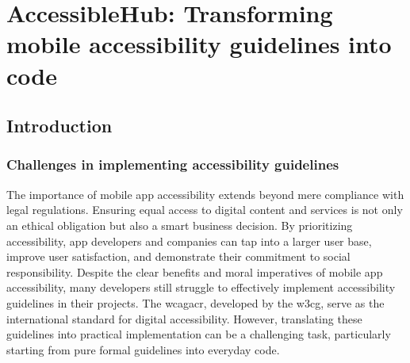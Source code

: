 \chapter{AccessibleHub: Transforming mobile accessibility guidelines into code}
\label{chap:accessibility-toolkit}


\section{Introduction}
\label{sec:intro}

\subsection{Challenges in implementing accessibility guidelines}

The importance of mobile app accessibility extends beyond mere compliance with legal regulations. Ensuring equal access to digital content and services is not only an ethical obligation but also a smart business decision. By prioritizing accessibility, app developers and companies can tap into a larger user base, improve user satisfaction, and demonstrate their commitment to social responsibility.
Despite the clear benefits and moral imperatives of mobile app accessibility, many developers still struggle to effectively implement accessibility guidelines in their projects. The \acrshort{wcagacr}, developed by the \gls{w3cg}, serve as the international standard for digital accessibility. However, translating these guidelines into practical implementation can be a challenging task, particularly starting from pure formal guidelines into everyday code. \\

